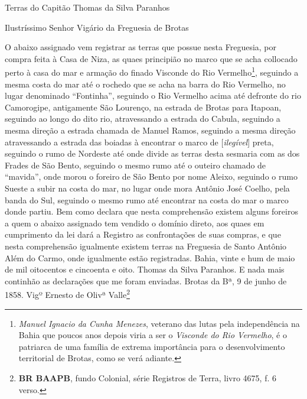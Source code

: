 \begin{citacao}
Terras do Capitão Thomas da Silva Paranhos

Ilustríssimo Senhor Vigário da Freguesia de Brotas

O abaixo assignado vem registrar as terras que possue nesta Freguesia, por compra feita à Casa de Niza, as quaes principião no marco que se acha collocado perto à casa do mar e armação do finado Visconde do Rio Vermelho\footnote{\textit{Manuel Ignacio da Cunha Menezes}, veterano das lutas pela independência na Bahia que poucos anos depois viria a ser o \textit{Visconde do Rio Vermelho}, é o patriarca de uma família de extrema importância para o desenvolvimento territorial de Brotas, como se verá adiante.}, seguindo a mesma costa do mar até o rochedo que se acha na barra do Rio Vermelho, no lugar denominado ``Fontinha'', seguindo o Rio Vermelho acima até defronte do rio Camorogipe, antigamente São Lourenço, na estrada de Brotas para Itapoan, seguindo ao longo do dito rio, atravessando a estrada do Cabula, seguindo a mesma direção a estrada chamada de Manuel Ramos, seguindo a mesma direção atravessando a estrada das boiadas à encontrar o marco de [\textit{ilegível}] preta, seguindo o rumo de Nordeste até onde divide as terras desta sesmaria com as dos Frades de São Bento, seguindo o mesmo rumo até o outeiro chamado de ``mavida'', onde morou o foreiro de São Bento por nome Aleixo, seguindo o rumo Sueste a subir na costa do mar, no lugar onde mora Antônio José Coelho, pela banda do Sul, seguindo o mesmo rumo até encontrar na costa do mar o marco donde partiu. Bem como declara que nesta comprehensão existem alguns foreiros a quem o abaixo assignado tem vendido o domínio direto, aos quaes em cumprimento da lei dará a Registro as confrontações de suas compras, e que nesta comprehensão igualmente existem terras na Freguesia de Santo Antônio Além do Carmo, onde igualmente estão registradas. Bahia, vinte e hum de maio de mil oitocentos e cincoenta e oito. Thomas da Silva Paranhos. E nada mais continhão as declarações que me foram enviadas. Brotas da Bª, 9 de junho de 1858. Vigº Ernesto de Olivª Valle\footnote{\textbf{BR BAAPB}, fundo Colonial, série Registros de Terra, livro 4675, f. 6 verso.}
\end{citacao}

